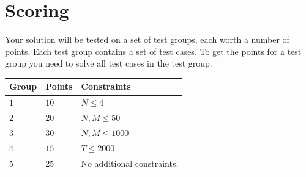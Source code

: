 \section*{Scoring}
Your solution will be tested on a set of test groups, each worth a number of points. Each test group contains
a set of test cases. To get the points for a test group you need to solve all test cases in the test group.

\noindent
\begin{tabular}{| l | l | p{12cm} |}
  \hline
  \textbf{Group} & \textbf{Points} & \textbf{Constraints} \\ \hline
  $1$    & $10$      & $N \le 4$ \\ \hline
  $2$    & $20$      & $N, M \le 50$ \\ \hline
  $3$    & $30$      & $N, M \le 1000$ \\ \hline
  $4$    & $15$      & $T \le 2000$ \\ \hline
  $5$    & $25$      & No additional constraints. \\ \hline
\end{tabular}

